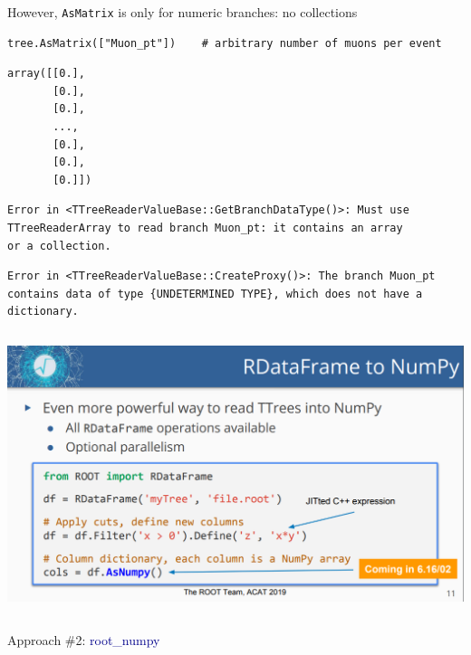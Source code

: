 \documentclass[aspectratio=169]{beamer}
\begin{document}
\begin{frame}[fragile]{However, {\tt AsMatrix} is only for numeric branches: no collections}
\vspace{0.5 cm}

\small
\begin{verbatim}
tree.AsMatrix(["Muon_pt"])    # arbitrary number of muons per event
\end{verbatim}
\begin{verbatim}
array([[0.],
       [0.],
       [0.],
       ...,
       [0.],
       [0.],
       [0.]])
\end{verbatim}

\vspace{-0.2 cm}
\color{gray}
\begin{verbatim}
Error in <TTreeReaderValueBase::GetBranchDataType()>: Must use
TTreeReaderArray to read branch Muon_pt: it contains an array
or a collection.
\end{verbatim}
\begin{verbatim}
Error in <TTreeReaderValueBase::CreateProxy()>: The branch Muon_pt
contains data of type {UNDETERMINED TYPE}, which does not have a
dictionary.
\end{verbatim}
\end{frame}

\begin{frame}{}
\vspace{-0.1 cm}
\begin{columns}
\includegraphics[width=\linewidth]{03-coming-soon-2.png}
\end{columns}
\end{frame}

\begin{frame}{}
\LARGE
\begin{center}
Approach \#2: \textcolor{darkblue}{root\_numpy}
\end{center}
\end{frame}
\end{document}

